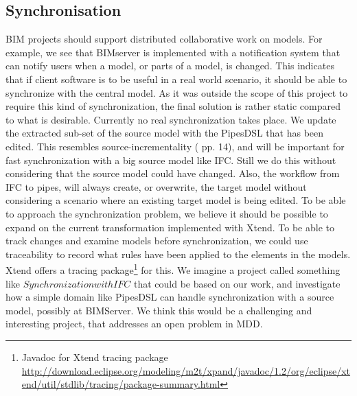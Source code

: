 \subsection{Synchronisation}
    BIM projects should support distributed collaborative work on models. For example, we see that BIMserver is implemented with a notification system that can notify users when a model, or parts of a model, is changed. This indicates that if client software is to be useful in a real world scenario, it should be able to synchronize with the central model. As it was outside the scope of this project to require this kind of synchronization, the final solution is rather static compared to what is desirable. Currently no real synchronization takes place. We update the extracted sub-set of the source model with the PipesDSL that has been edited. This resembles source-incrementality (\cite{czarnecki06} pp. 14), and will be important for fast synchronization with a big source model like IFC. Still we do this without considering that the source model could have changed. Also, the workflow from IFC to pipes, will always create, or overwrite, the target model without considering a scenario where an existing target model is being edited. To be able to approach the synchronization problem, we believe it should be possible to expand on the current transformation implemented with Xtend. To be able to track changes and examine models before synchronization, we could use traceability\cite{czarnecki06} to record what rules have been applied to the elements in the models. Xtend offers a tracing package\footnote{Javadoc for Xtend tracing package \url{http://download.eclipse.org/modeling/m2t/xpand/javadoc/1.2/org/eclipse/xtend/util/stdlib/tracing/package-summary.html}} for this. We imagine a project called something like $Synchronization with IFC$ that could be based on our work, and investigate how a simple domain like PipesDSL can handle synchronization with a source model, possibly at BIMServer. We think this would be a challenging and interesting project, that addresses an open problem in MDD.

